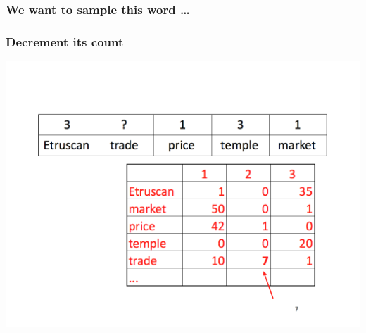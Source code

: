 \documentclass[xcolor=dvipsnames]{beamer}
\begin{document}
\begin{frame}
  \frametitle{We want to sample this word \dots}
\end{frame}

\begin{frame}
  \frametitle{Decrement its count}
    \includegraphics[width=\linewidth]{topic_models/mimno_007}
\end{frame}
\end{document}

